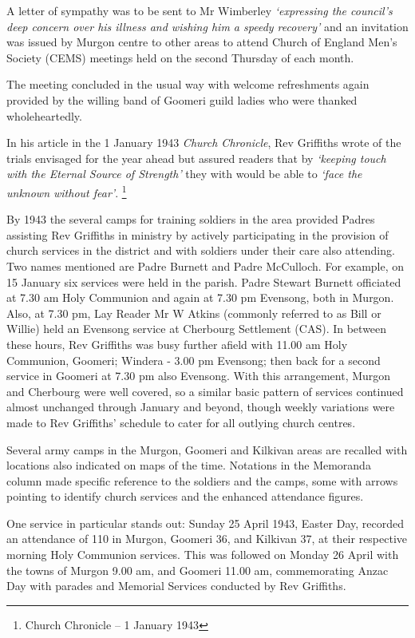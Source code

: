 A letter of sympathy was to be sent to Mr Wimberley \emph{`expressing the council's deep concern over his illness and wishing him a speedy recovery'} and an invitation was issued by Murgon centre to other areas to attend Church of England Men's Society (CEMS) meetings held on the second Thursday of each month.



The meeting concluded in the usual way with welcome refreshments again provided by the willing band of Goomeri guild ladies who were thanked wholeheartedly.



In his article in the 1 January 1943 \emph{Church Chronicle}, Rev Griffiths wrote of the trials envisaged for the year ahead but assured readers that by \emph{`keeping touch with the Eternal Source of Strength'} they with would be able to \emph{`face the unknown without fear'}. \footnote{Church Chronicle -- 1 January 1943}


By 1943 the several camps for training soldiers in the area provided Padres assisting Rev Griffiths in ministry by actively participating in the provision of church services in the district and with soldiers under their care also attending. Two names mentioned are Padre Burnett and Padre McCulloch. For example, on 15 January six services were held in the parish. Padre Stewart Burnett officiated at 7.30 am Holy Communion and again at 7.30 pm Evensong, both in Murgon. Also, at 7.30 pm, Lay Reader Mr W Atkins (commonly referred to as Bill or Willie) held an Evensong service at Cherbourg Settlement (CAS). In between these hours, Rev Griffiths was busy further afield with 11.00 am Holy Communion, Goomeri; Windera - 3.00 pm Evensong; then back for a second service in Goomeri at 7.30 pm also Evensong. With this arrangement, Murgon and Cherbourg were well covered, so a similar basic pattern of services continued almost unchanged through January and beyond, though weekly variations were made to Rev Griffiths' schedule to cater for all outlying church centres.



Several army camps in the Murgon, Goomeri and Kilkivan areas are recalled with locations also indicated on maps of the time. Notations in the Memoranda column made specific reference to the soldiers and the camps, some with arrows pointing to identify church services and the enhanced attendance figures.



One service in particular stands out: Sunday 25 April 1943, Easter Day, recorded an attendance of 110 in Murgon, Goomeri 36, and Kilkivan 37, at their respective morning Holy Communion services. This was followed on Monday 26 April with the towns of Murgon 9.00 am, and Goomeri 11.00 am, commemorating Anzac Day with parades and Memorial Services conducted by Rev Griffiths.



